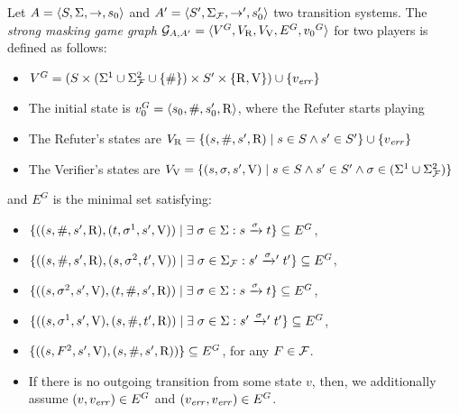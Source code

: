 \begin{defi} \label{def:strong_masking_game_graph}
  Let $A=\langle S, \Sigma, \rightarrow, s_0 \rangle$ and $A'=\langle S',
  \Sigma_{\mathcal{F}}, \rightarrow', s'_0 \rangle$ two transition systems.
  The \emph{strong masking game graph} 
  $\mathcal{G}_{A, A'} = \langle V^G, V_{\mathrm{R}}, V_{\mathrm{V}}, E^G, {v_0}^G \rangle$ 
  for two players is defined as follows:

\begin{itemize}
  \item $V^G = (S \times ( \Sigma^1 \cup \Sigma_{\mathcal{F}}^2 \cup\{\#\}) \times S' \times \{ \mathrm{R}, \mathrm{V} \}) 
  \cup \{v_{\mathit{err}}\}$
  \item The initial state is $v_0^G = \langle s_0, \#, s'_0, \mathrm{R} \rangle$, where the Refuter starts 
  playing
  \item The Refuter's states are $V_{\mathrm{R}} = \{ (s, \#, s', \mathrm{R}) \mid s \in S \wedge s' \in S' \} 
  \cup \{v_{\mathit{err}}\}$
  \item The Verifier's states are $V_{\mathrm{V}} = \{ (s, \sigma, s', \mathrm{V}) \mid s \in S \wedge s' \in S' \wedge \sigma \in ( \Sigma^1 \cup \Sigma_{\mathcal{F}}^2 )\}$
\end{itemize}
and $E^G$ is the minimal set satisfying:
\begin{itemize}
  \item $\{ ( (s, \#, s', \mathrm{R}) , (t, \sigma^{1}, s', \mathrm{V})) \mid \exists\;\sigma \in \Sigma: s \xrightarrow{\sigma} t \} \subseteq E^G$,

  \item $\{ ((s, \#, s', \mathrm{R}), (s, \sigma^{2}, t', \mathrm{V}))  \mid \exists\;\sigma \in \Sigma_{\mathcal{F}}: s' \mathrel{{\xrightarrow[]{\sigma}}{}'} t' \} \subseteq E^G$,

  \item $\{ ((s, \sigma^2, s', \mathrm{V}), (t, \#, s', \mathrm{R})) \mid \exists\;\sigma \in \Sigma: s \xrightarrow{\sigma} t \} \subseteq E^G$,

  \item $\{ ((s, \sigma^1, s', \mathrm{V}), (s, \#, t', \mathrm{R})) \mid \exists\;\sigma \in \Sigma: s' \mathrel{{\xrightarrow[]{\sigma}}{}'} t' \} \subseteq E^G$,

  \item $\{ ((s, F^2, s', \mathrm{V}), (s, \#, s', \mathrm{R})) \} \subseteq E^G$, for any $F \in \mathcal{F}$. 

  \item If there is no outgoing transition from some state $v$, then, we additionally assume  $(v, v_{\mathit{err}}) \in E^G$ and $(v_{\mathit{err}}, v_{\mathit{err}}) \in E^G$.
\end{itemize}

\end{defi}

